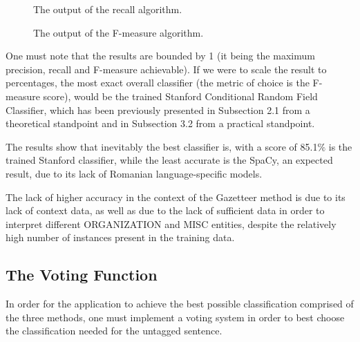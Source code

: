 \documentclass[12pt,a4paper]{article}
\begin{document}
\begin{figure}[h!]
\begin{center}
\end{center}
\caption{The output of the recall algorithm.}
\end{figure}

\begin{figure}[h!]
\begin{center}
\end{center}
\caption{The output of the F-measure algorithm.}
\end{figure}

\qquad One must note that the results are bounded by 1 (it being the maximum precision, recall and F-measure achievable). If we were to scale the result to percentages, the most exact overall classifier (the metric of choice is the F-measure score), would be the trained Stanford Conditional Random Field Classifier, which has been previously presented in Subsection 2.1 from a theoretical standpoint and in Subsection 3.2 from a practical standpoint.

\qquad The results show that inevitably the best classifier is, with a score of 85.1$\%$ is the trained Stanford classifier, while the least accurate is the SpaCy, an expected result, due to its lack of Romanian language-specific models. 

\qquad The lack of higher accuracy in the context of the Gazetteer method is due to its lack of context data, as well as due to the lack of sufficient data in order to interpret different ORGANIZATION and MISC entities, despite the relatively high number of instances present in the training data.

\subsection{The Voting Function}

\qquad \quad In order for the application to achieve the best possible classification comprised of the three methods, one must implement a voting system in order to best choose the classification needed for the untagged sentence.
\end{document}

